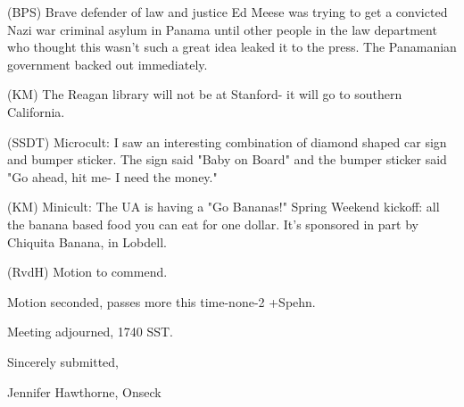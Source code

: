 \documentclass[12pt]{article}
\begin{document}
(BPS) Brave defender of law and justice Ed Meese was trying to get a convicted Nazi war criminal asylum in Panama until other people in the law department who thought this wasn't such a great idea leaked it to the press. The Panamanian government backed out immediately.

(KM) The Reagan library will not be at Stanford- it will go to southern California.

(SSDT) Microcult: I saw an interesting combination of diamond shaped car sign and bumper sticker. The sign said "Baby on Board" and the bumper sticker said "Go ahead, hit me- I need the money."

(KM) Minicult: The UA is having a "Go Bananas!" Spring Weekend kickoff: all the banana based food you can eat for one dollar. It's sponsored in part by Chiquita Banana, in Lobdell.

(RvdH) Motion to commend.

Motion seconded, passes more this time-none-2 +Spehn.

\vspace{12pt}

\noindent
Meeting adjourned, 1740 SST.

\vspace{18pt}

\centerline{Sincerely submitted,}
\centerline{Jennifer Hawthorne, Onseck}
\end{document}

